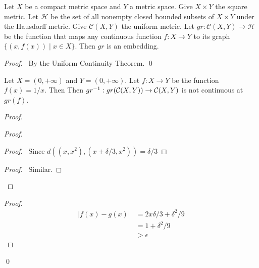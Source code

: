 \begin{corollary}
    Let $X$ be a compact metric space and $Y$ a metric space. Give $X \times Y$ the square metric. Let $\mathcal{H}$ be the set of all nonempty closed bounded
    subsets of $X \times Y$ under the Hausdorff metric. Give $\mathcal{C}(X,Y)$ the uniform metric. Let $gr : \mathcal{C}(X,Y) \rightarrow
    \mathcal{H}$ be the function that maps any continuous function $f : X \rightarrow Y$ to its graph $\{ (x, f(x)) \mid x \in X \}$.
    Then $gr$ is an embedding.    
\end{corollary}

\begin{proof}
    \pf\ By the Uniform Continuity Theorem. \qed
\end{proof}

\begin{proposition}
    Let $X = (0,+\infty)$ and $Y = (0,+\infty)$. Let $f : X \rightarrow Y$ be the function $f(x) = 1 / x$.
    Then Then ${gr}^{-1} : gr(\mathcal{C}(X,Y)) \rightarrow \mathcal{C}(X,Y)$
    is not continuous at $gr(f)$.
\end{proposition}

\begin{proof}
    \pf
    \begin{proof}
        \begin{proof}
            \pf\ Since $d((x,x^2),(x+\delta/3,x^2)) = \delta/3$
        \end{proof}
        \begin{proof}
            \pf\ Similar.
        \end{proof}
    \end{proof}
    \begin{proof}
        \begin{align*}
            |f(x)-g(x)| & = 2x\delta/3+\delta^2/9 \\
            & = 1 + \delta^2/9 \\
            & > \epsilon
        \end{align*}
    \end{proof}
    \qed
\end{proof}

